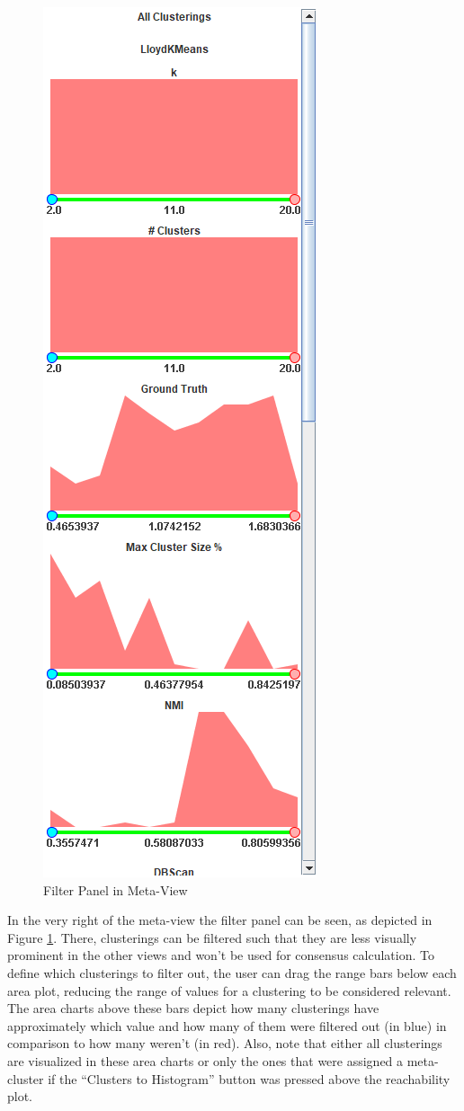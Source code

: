 \documentclass[
	a4paper,
	english,
	twoside,
	openright,               
	11pt                            
	]{report}
\begin{document}
\begin{figure}[h]
	\centering
	\includegraphics[scale=.5]{filter-panel}
	\caption{Filter Panel in Meta-View}
	\label{fig:filterpanel}
\end{figure}

In the very right of the meta-view the filter panel can be seen, as depicted in Figure \ref{fig:filterpanel}. There, clusterings can be filtered such that they are less visually prominent in the other views and won't be used for consensus calculation. To define which clusterings to filter out, the user can drag the range bars below each area plot, reducing the range of values for a clustering to be considered relevant. The area charts above these bars depict how many clusterings have approximately which value and how many of them were filtered out (in blue) in comparison to how many weren't (in red). Also, note that either all clusterings are visualized in these area charts or only the ones that were assigned a meta-cluster if the ``Clusters to Histogram'' button was pressed above the reachability plot.
\end{document}
